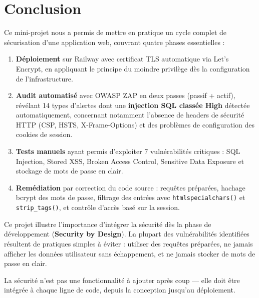 ﻿\documentclass[12pt,a4paper]{report}
\begin{document}
\chapter*{Conclusion}

Ce mini-projet nous a permis de mettre en pratique un cycle complet de sécurisation d'une
application web, couvrant quatre phases essentielles :

\begin{enumerate}
  \item \textbf{Déploiement} sur Railway avec certificat TLS automatique via Let's Encrypt,
    en appliquant le principe du moindre privilège dès la configuration de l'infrastructure.

  \item \textbf{Audit automatisé} avec OWASP ZAP en deux passes (passif + actif), révélant 14 types d'alertes dont une \textbf{injection SQL classée High} détectée automatiquement, concernant notamment
    l'absence de headers de sécurité HTTP (CSP, HSTS, X-Frame-Options) et des problèmes de
    configuration des cookies de session.

  \item \textbf{Tests manuels} ayant permis d'exploiter 7 vulnérabilités critiques :
    SQL Injection, Stored XSS, Broken Access Control, Sensitive Data Exposure et stockage
    de mots de passe en clair.

  \item \textbf{Remédiation} par correction du code source : requêtes préparées, hachage
    bcrypt des mots de passe, filtrage des entrées avec \texttt{htmlspecialchars()} et
    \texttt{strip\_tags()}, et contrôle d'accès basé sur la session.
\end{enumerate}

Ce projet illustre l'importance d'intégrer la sécurité dès la phase de développement
(\textbf{Security by Design}). La plupart des vulnérabilités identifiées résultent de
pratiques simples à éviter : utiliser des requêtes préparées, ne jamais afficher les données
utilisateur sans échappement, et ne jamais stocker de mots de passe en clair.

\begin{infobox}
La sécurité n'est pas une fonctionnalité à ajouter après coup --- elle doit être intégrée
à chaque ligne de code, depuis la conception jusqu'au déploiement.
\end{infobox}
\end{document}

